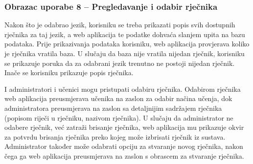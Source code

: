 \eject

\subsubsection{{Obrazac uporabe 8 -- Pregledavanje i odabir rječnika}}

Nakon što je odabrao jezik, korisniku se treba prikazati popis svih dostupnih rječnika za taj jezik, a web aplikacija te podatke dohvaća slanjem upita na bazu podataka. Prije prikazivanja podataka korisniku, web aplikacija provjerava koliko je rječnika vratila baza. U slučaju da baza nije vratila nijedan rječnik, korisniku se prikazuje poruka da za odabrani jezik trenutno ne postoji nijedan rječnik. Inače se korisniku prikazuje popis rječnika.

I administratori i učenici mogu pristupati odabiru rječnika. Odabirom rječnika web aplikacija preusmjerava učenika na zaslon za odabir načina učenja, dok administratora preusmjerava na zaslon sa detaljnijim sadržajem rječnika (popisom riječi u rječniku, nazivom rječnika). U slučaju da administrator ne odabere rječnik, već zatraži brisanje rječnika, web aplikacija mu prikazuje okvir za potvrdu brisanja rječnika preko kojeg može izbrisati rječnik iz sustava. Administrator također može odabrati opciju za stvaranje novog rječnika, nakon čega ga web aplikacija preusmjerava na zaslon s obrascem za stvaranje rječnika.

